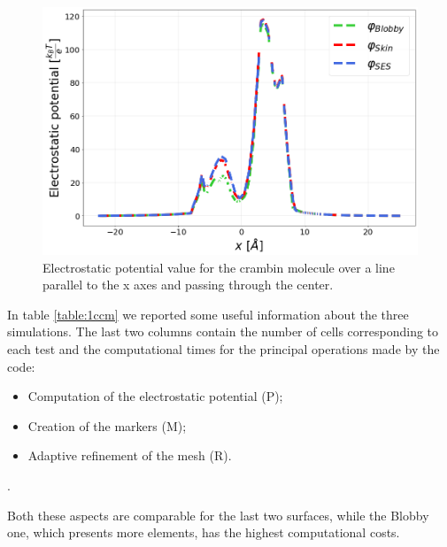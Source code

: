 \documentclass[11pt,a4paper]{article}
\begin{document}
\begin{figure}[H]
    \centering
    \includegraphics[scale = 0.3]{Images/1ccm_superfici_x.png}
    \caption{Electrostatic potential value for the crambin molecule over a line parallel to the x axes and passing through the center.}
    \label{fig:phi_x_surfs}
\end{figure}

 In table \ref{table:1ccm} we reported some useful information about the three simulations. The last two columns contain the number of cells corresponding to each test and the computational times for the principal operations made by the code:
\begin{itemize}
    \item Computation of the electrostatic potential (P);
    \item Creation of the markers (M);
    \item Adaptive refinement of the mesh (R).
\end{itemize}.

\noindent Both these aspects are comparable for the last two surfaces, while the Blobby one, which presents more elements, has the highest computational costs.
\end{document}
